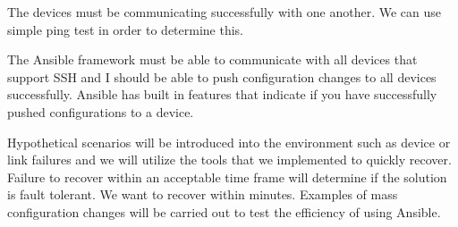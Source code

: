 \documentclass[12pt, letterpaper]{article}
\begin{document}
\medskip

The devices must be communicating successfully with one another. We can use simple ping test in order to determine this. 

\medskip

The Ansible framework must be able to communicate with all devices that support SSH and I should be able to push configuration changes to all devices successfully. Ansible has built in features that indicate if you have successfully pushed configurations to a device. 

\medskip

Hypothetical scenarios will be introduced into the environment such as device or link failures and we will utilize the tools that we implemented to quickly recover. Failure to recover within an acceptable time frame will determine if the solution is fault tolerant. We want to recover within minutes. Examples of mass configuration changes will be carried out to test the efficiency of using Ansible. 
\end{document}
